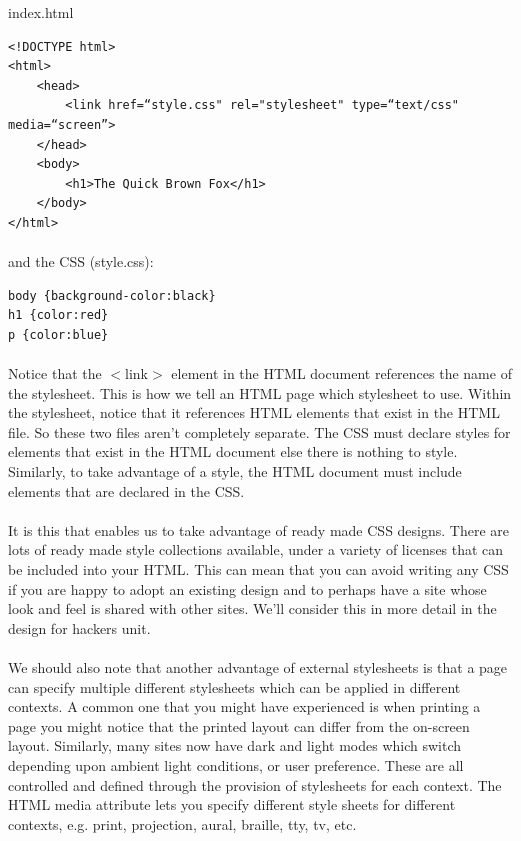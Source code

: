 	index.html

\begin{lstlisting}
<!DOCTYPE html>
<html>
	<head>
		<link href=“style.css" rel="stylesheet" type=“text/css" media=“screen”>
	</head>
	<body>
		<h1>The Quick Brown Fox</h1>
	</body>
</html>
\end{lstlisting}

\paragraph{} and the CSS (style.css):

\begin{lstlisting}
body {background-color:black}
h1 {color:red}
p {color:blue}
\end{lstlisting}

\paragraph{} Notice that the $<$link$>$ element in the HTML document references the name of the stylesheet. This is how we tell an HTML page which stylesheet to use. Within the stylesheet, notice that it references HTML elements that exist in the HTML file. So these two files aren't completely separate. The CSS must declare styles for elements that exist in the HTML document else there is nothing to style. Similarly, to take advantage of a style, the HTML document must include elements that are declared in the CSS.

\paragraph{} It is this that enables us to take advantage of ready made CSS designs. There are lots of ready made style collections available, under a variety of licenses that can be included into your HTML. This can mean that you can avoid writing any CSS if you are happy to adopt an existing design and to perhaps have a site whose look and feel is shared with other sites. We'll consider this in more detail in the design for hackers unit.

\paragraph{} We should also note that another advantage of external stylesheets is that a page can specify multiple different stylesheets which can be applied in different contexts. A common one that you might have experienced is when printing a page you might notice that the printed layout can differ from the on-screen layout. Similarly, many sites now have dark and light modes which switch depending upon ambient light conditions, or user preference. These are all controlled and defined through the provision of stylesheets for each context. The HTML media attribute lets you specify different style sheets for different contexts, e.g. print, projection, aural, braille, tty, tv, etc.



